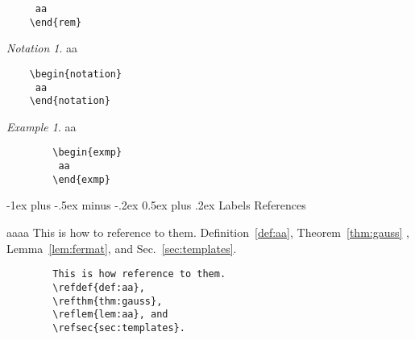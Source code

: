 \documentclass[a4paper,10pt,landscape]{article}
\makeatletter
\renewcommand{\section}{\@startsection{section}{1}{0mm}%
                                {-1ex plus -.5ex minus -.2ex}%
                                {0.5ex plus .2ex}%
                                {\normalfont\large\bfseries}}
\theoremstyle{definition}
\theoremstyle{remark}
\newtheorem*{notation}{Notation}
\newtheorem{exmp}{Example}[section] %
\newcommand{\refsec}[1]{Sec.~\ref{#1}}
\newcommand{\refthm}[1]{Theorem~\ref{#1}}
\newcommand{\reflem}[1]{Lemma~\ref{#1}}
\newcommand{\refdef}[1]{Definition~\ref{#1}}
\makeatother
\begin{document}
\begin{multicols}{3}
\begin{multicols}{2}
\begin{verbatim}
	 aa
	\end{rem}
	\end{verbatim}
\end{multicols}
\begin{multicols}{2}
	\begin{notation}
		aa
	\end{notation}
\columnbreak
	\begin{verbatim}
	\begin{notation}
	 aa
	\end{notation}
	\end{verbatim}
\end{multicols}
\begin{multicols}{2}
	\begin{exmp}
		aa
	\end{exmp}
\columnbreak
	\begin{verbatim}
		\begin{exmp}
		 aa
		\end{exmp}
	\end{verbatim}
\end{multicols}



\section{Labels References}
\begin{multicols}{2}
	aaaa
	This is how to reference to them.
	\refdef{def:aa}, 
	\refthm{thm:gauss}	,
	\reflem{lem:fermat}, and
	\refsec{sec:templates}.
\columnbreak
	\begin{verbatim}
		This is how reference to them.
		\refdef{def:aa}, 
		\refthm{thm:gauss},
		\reflem{lem:aa}, and
		\refsec{sec:templates}.
	\end{verbatim}
\end{multicols}

\end{multicols}
\end{document}
